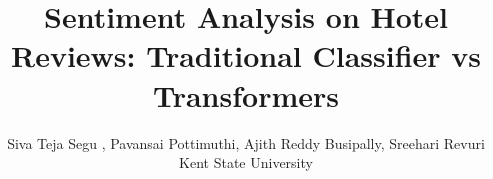 \usepackage{filecontents}
\usepackage{cite}
\usepackage{amsmath,amssymb,amsfonts}
\usepackage{graphicx}
\usepackage{textcomp}
\usepackage{tabularx}
\usepackage{subcaption}
\usepackage{makecell}
\usepackage{url}
\usepackage[switch]{lineno}
\usepackage{listings}
\usepackage{multirow}

\captionsetup{compatibility=false}
\usepackage[margin=0.5in]{geometry}
\usepackage{textcomp}

\usepackage{listings}






\title{ Sentiment Analysis on Hotel Reviews: Traditional Classifier vs Transformers}

\author{Siva Teja Segu , Pavansai Pottimuthi, Ajith Reddy Busipally, Sreehari Revuri\\

Kent State University}

